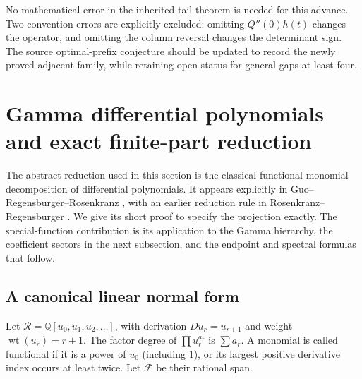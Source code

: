 \documentclass[11pt,a4paper]{article}
\numberwithin{equation}{section}
\theoremstyle{definition}
\theoremstyle{remark}
\DeclareMathOperator{\wt}{wt}
\newcommand{\Q}{\mathbb Q}
\begin{document}
No mathematical error in the inherited tail theorem is needed for
this advance.  Two convention errors are explicitly excluded:
omitting $Q''(0)h(t)$ changes the operator, and omitting the column
reversal changes the determinant sign.  The source optimal-prefix
conjecture should be updated to record the newly proved adjacent
family, while retaining open status for general gaps at least four.



\section[Gamma differential polynomials and exact finite-part reduction]{Gamma differential polynomials\\and exact finite-part reduction}
\label{gamma:sec}

The abstract reduction used in this section is the classical
functional-monomial decomposition of differential polynomials.
It appears explicitly in Guo--Regensburger--Rosenkranz
\cite[Proposition~4.10]{Guo2014}, with an earlier reduction rule in
Rosenkranz--Regensburger \cite[Lemma~5]{Rosenkranz2008}.
We give its short proof to specify the projection exactly.  The
special-function contribution is its application to the Gamma
hierarchy, the coefficient sectors in the next subsection, and the
endpoint and spectral formulas that follow.

\subsection{A canonical linear normal form}

Let $\mathscr R=\Q[u_0,u_1,u_2,\ldots]$, with derivation
$D u_r=u_{r+1}$ and weight $\wt(u_r)=r+1$.
The factor degree of $\prod u_r^{a_r}$ is $\sum a_r$.
A monomial is called functional if it is a power of $u_0$ (including
$1$), or its largest positive derivative index occurs at least twice.
Let $\mathscr F$ be their rational span.
\end{document}
